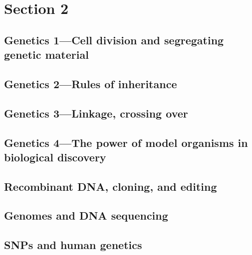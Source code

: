 \documentclass[../bio.tex]{subfiles}
\begin{document}
\chapter{Section 2}
\section{Genetics 1—Cell division and segregating genetic material}
\section{Genetics 2—Rules of inheritance}
\section{Genetics 3—Linkage, crossing over}
\section{Genetics 4—The power of model organisms in biological discovery}
\section{Recombinant DNA, cloning, and editing}
\section{Genomes and DNA sequencing}
\section{SNPs and human genetics}
\end{document}
